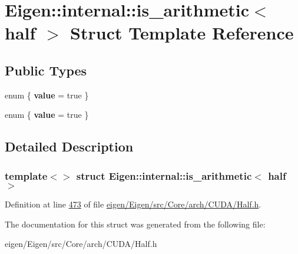 \hypertarget{struct_eigen_1_1internal_1_1is__arithmetic_3_01half_01_4}{}\section{Eigen\+:\+:internal\+:\+:is\+\_\+arithmetic$<$ half $>$ Struct Template Reference}
\label{struct_eigen_1_1internal_1_1is__arithmetic_3_01half_01_4}
\subsection*{Public Types}
\begin{DoxyCompactItemize}
\item 
\mbox{\label{struct_eigen_1_1internal_1_1is__arithmetic_3_01half_01_4_a7bed8468b4969b77bf73a2efc9593e4e}} 
enum \{ {\bfseries value} = true
 \}
\item 
\mbox{\label{struct_eigen_1_1internal_1_1is__arithmetic_3_01half_01_4_a5c3a10ee71a1383f42e54610ba994de4}} 
enum \{ {\bfseries value} = true
 \}
\end{DoxyCompactItemize}


\subsection{Detailed Description}
\subsubsection*{template$<$$>$\newline
struct Eigen\+::internal\+::is\+\_\+arithmetic$<$ half $>$}



Definition at line \hyperlink{eigen_2_eigen_2src_2_core_2arch_2_c_u_d_a_2_half_8h_source_l00473}{473} of file \hyperlink{eigen_2_eigen_2src_2_core_2arch_2_c_u_d_a_2_half_8h_source}{eigen/\+Eigen/src/\+Core/arch/\+C\+U\+D\+A/\+Half.\+h}.



The documentation for this struct was generated from the following file\+:\begin{DoxyCompactItemize}
\item 
eigen/\+Eigen/src/\+Core/arch/\+C\+U\+D\+A/\+Half.\+h\end{DoxyCompactItemize}
